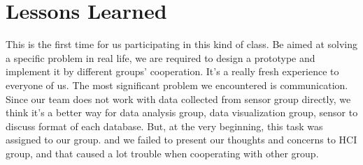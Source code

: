 \documentclass{article}
\begin{document}
\section{Lessons Learned}
This is the first time for us participating in this kind of class. Be aimed at solving a specific problem in real life, we are required to design a prototype and implement it by different groups’ cooperation. It’s a really fresh experience to everyone of us. \newline
The most significant problem we encountered is communication. Since our team does not work with data collected from sensor group directly, we think it's a better way for data analysis group, data visualization group, sensor to discuss format of each database. But, at the very beginning, this task was assigned to our group. and we failed to present our thoughts and concerns to HCI group, and that caused a lot trouble when cooperating with other group.
\end{document}
